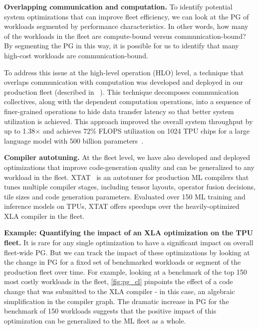  



 \textbf{Overlapping communication and computation.}
To identify potential system optimizations that can improve fleet efficiency, we can look at the PG of workloads segmented by performance characteristics. In other words, how many of the workloads in the fleet are compute-bound versus communication-bound? By segmenting the PG in this way, it is possible for us to identify that many high-cost workloads are communication-bound. 

To address this issue at the high-level operation (HLO) level, a technique that overlaps communication with computation was developed and deployed in our production fleet (described in ~\citet{wang2022overlap}). This technique decomposes communication collectives, along with the dependent computation operations, into a sequence of finer-grained operations to hide data transfer latency so that better system utilization is achieved. This approach improved the overall system throughput by up to 1.38$\times$ and achieves 72\% FLOPS utilization on 1024 TPU chips for a large language model with 500 billion parameters~\cite{wang2022overlap}.

\textbf{Compiler autotuning.}
At the fleet level, we have also developed and deployed optimizations that improve code-generation quality and can be generalized to any workload in the fleet. XTAT~\cite{phothilimthana2021flexible} is an autotuner for production ML compilers that tunes multiple compiler stages, including tensor layouts, operator fusion decisions, tile sizes and code generation parameters. Evaluated over 150 ML training and inference models on TPUs, XTAT offers speedups over the heavily-optimized XLA compiler in the fleet.

\textbf{Example: Quantifying the impact of an XLA optimization on the TPU fleet.}
It is rare for any single optimization to have a significant impact on overall fleet-wide PG. But we can track the impact of these optimizations by looking at the change in PG for a fixed set of benchmarked workloads or segment of the production fleet over time. For example, looking at a benchmark of the top 150 most costly workloads in the fleet, \autoref{fig:pg_cl} pinpoints the effect of a code change that was submitted to the XLA compiler - in this case, an algebraic simplification in the compiler graph. The dramatic increase in PG for the benchmark of 150 workloads suggests that the positive impact of this optimization can be generalized to the ML fleet as a whole. 

